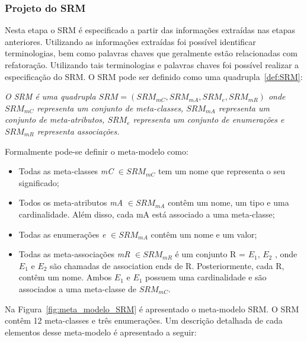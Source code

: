 \subsubsection{Projeto do SRM}

Nesta etapa o SRM é especificado a partir das informações extraídas nas etapas anteriores. Utilizando as informações extraídas foi possível identificar terminologias, bem como palavras chaves que geralmente estão relacionadas com refatoração. Utilizando tais terminologias e palavras chaves foi possível realizar a especificação do SRM. O SRM pode ser definido como uma quadrupla~\ref{def:SRM}: 


\begin{definicao}\label{def:SRM}
    \textit{O SRM é uma quadrupla $SRM = (SRM_{mC}, SRM_{mA}, SRM_{e}, SRM_{mR})$ onde $SRM_{mC} $ representa um conjunto de meta-classes, $SRM_{mA}$ representa um conjunto de meta-atributos, $SRM_{e}$ representa um conjunto de enumerações e $SRM_{mR}$ representa associações.}
\end{definicao}

Formalmente pode-se definir o meta-modelo como:

\begin{itemize}
	\item Todas as meta-classes \textit{mC} $\in SRM_{mC}$ tem um nome que representa o seu significado;
	\item Todos os meta-atributos \textit{mA} $\in SRM_{mA}$ contêm um nome, um tipo e uma cardinalidade. Além disso, cada mA está associado a uma meta-classe;
	\item Todas as enumerações \textit{e} $\in SRM_{mA}$ contêm um nome e um valor;
	\item Todas as meta-associações \textit{mR} $\in SRM_{mR}$ é um conjunto R = $E_{1}$, $E_{2}$  , onde  $E_{1}$ e $E_{2}$ são chamadas de association ends de R. Posteriormente, cada R, contêm um nome. Ambos $E_{1}$  e $E_{1}$ possuem uma cardinalidade e são associados a uma meta-classe de $SRM_{mC}$.
\end{itemize}

Na Figura~\ref{fig:meta_modelo_SRM} é apresentado o meta-modelo SRM. O SRM contêm 12 meta-classes e três enumerações. Um descrição detalhada de cada elementos desse meta-modelo é apresentado a  seguir:

